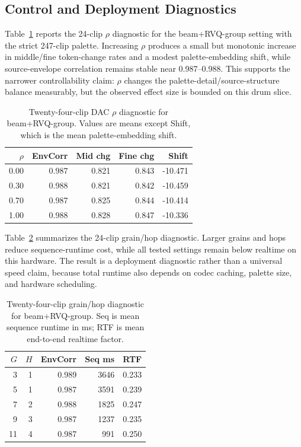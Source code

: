 \documentclass[twoside,a4paper]{article}
\begin{document}
\subsection{Control and Deployment Diagnostics}

Table~\ref{tab:rho-diagnostic} reports the 24-clip $\rho$ diagnostic for the beam+RVQ-group setting with the strict 247-clip palette. Increasing $\rho$ produces a small but monotonic increase in middle/fine token-change rates and a modest palette-embedding shift, while source-envelope correlation remains stable near 0.987--0.988. This supports the narrower controllability claim: $\rho$ changes the palette-detail/source-structure balance measurably, but the observed effect size is bounded on this drum slice.

\begin{table}[!t]
    \centering
    \scriptsize
    \setlength{\tabcolsep}{2.8pt}
    \caption{Twenty-four-clip DAC $\rho$ diagnostic for beam+RVQ-group. Values are means except Shift, which is the mean palette-embedding shift.}
    \label{tab:rho-diagnostic}
    \begin{tabular}{rrrrr}
    \toprule
    $\rho$ & EnvCorr & Mid chg & Fine chg & Shift \\
    \midrule
    0.00 & 0.987 & 0.821 & 0.843 & -10.471 \\
    0.30 & 0.988 & 0.821 & 0.842 & -10.459 \\
    0.70 & 0.987 & 0.825 & 0.844 & -10.414 \\
    1.00 & 0.988 & 0.828 & 0.847 & -10.336 \\
    \bottomrule
    \end{tabular}
\end{table}

Table~\ref{tab:grain-hop-diagnostic} summarizes the 24-clip grain/hop diagnostic. Larger grains and hops reduce sequence-runtime cost, while all tested settings remain below realtime on this hardware. The result is a deployment diagnostic rather than a universal speed claim, because total runtime also depends on codec caching, palette size, and hardware scheduling.

\begin{table}[!t]
    \centering
    \scriptsize
    \setlength{\tabcolsep}{2.8pt}
    \caption{Twenty-four-clip grain/hop diagnostic for beam+RVQ-group. Seq is mean sequence runtime in ms; RTF is mean end-to-end realtime factor.}
    \label{tab:grain-hop-diagnostic}
    \begin{tabular}{rrrrr}
    \toprule
    $G$ & $H$ & EnvCorr & Seq ms & RTF \\
    \midrule
    3 & 1 & 0.989 & 3646 & 0.233 \\
    5 & 1 & 0.987 & 3591 & 0.239 \\
    7 & 2 & 0.988 & 1825 & 0.247 \\
    9 & 3 & 0.987 & 1237 & 0.235 \\
    11 & 4 & 0.987 & 991 & 0.250 \\
    \bottomrule
    \end{tabular}
\end{table}
\end{document}
